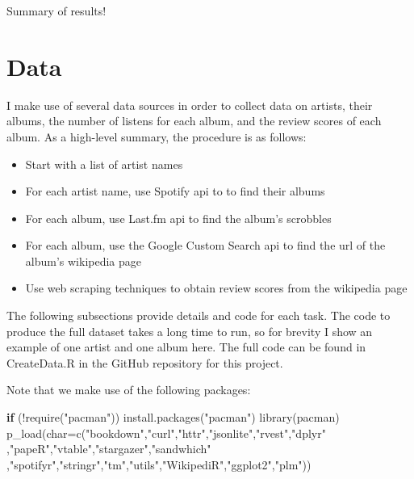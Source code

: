 \documentclass[
  11pt,
]{article}
\newenvironment{Shaded}{\begin{snugshade}}{\end{snugshade}}
\newcommand{\AttributeTok}[1]{\textcolor[rgb]{0.77,0.63,0.00}{#1}}
\newcommand{\ControlFlowTok}[1]{\textcolor[rgb]{0.13,0.29,0.53}{\textbf{#1}}}
\newcommand{\FunctionTok}[1]{\textcolor[rgb]{0.00,0.00,0.00}{#1}}
\newcommand{\NormalTok}[1]{#1}
\newcommand{\SpecialCharTok}[1]{\textcolor[rgb]{0.00,0.00,0.00}{#1}}
\newcommand{\StringTok}[1]{\textcolor[rgb]{0.31,0.60,0.02}{#1}}
\providecommand{\tightlist}{%
  \setlength{\itemsep}{0pt}\setlength{\parskip}{0pt}}
\begin{document}
Summary of results!

\hypertarget{data}{%
\section{Data}\label{data}}

I make use of several data sources in order to collect data on artists,
their albums, the number of listens for each album, and the review
scores of each album. As a high-level summary, the procedure is as
follows:

\begin{itemize}
\tightlist
\item
  Start with a list of artist names
\item
  For each artist name, use Spotify api to to find their albums
\item
  For each album, use Last.fm api to find the album's scrobbles
\item
  For each album, use the Google Custom Search api to find the url of
  the album's wikipedia page
\item
  Use web scraping techniques to obtain review scores from the wikipedia
  page
\end{itemize}

The following subsections provide details and code for each task. The
code to produce the full dataset takes a long time to run, so for
brevity I show an example of one artist and one album here. The full
code can be found in CreateData.R in the GitHub repository for this
project.

Note that we make use of the following packages:

\begin{Shaded}
\begin{Highlighting}[]
\ControlFlowTok{if}\NormalTok{ (}\SpecialCharTok{!}\FunctionTok{require}\NormalTok{(}\StringTok{"pacman"}\NormalTok{)) }\FunctionTok{install.packages}\NormalTok{(}\StringTok{"pacman"}\NormalTok{)}
\FunctionTok{library}\NormalTok{(pacman)}
\FunctionTok{p\_load}\NormalTok{(}\AttributeTok{char=}\FunctionTok{c}\NormalTok{(}\StringTok{"bookdown"}\NormalTok{,}\StringTok{"curl"}\NormalTok{,}\StringTok{"httr"}\NormalTok{,}\StringTok{"jsonlite"}\NormalTok{,}\StringTok{"rvest"}\NormalTok{,}\StringTok{"dplyr"}
\NormalTok{              ,}\StringTok{"papeR"}\NormalTok{,}\StringTok{"vtable"}\NormalTok{,}\StringTok{"stargazer"}\NormalTok{,}\StringTok{"sandwhich"}
\NormalTok{             ,}\StringTok{"spotifyr"}\NormalTok{,}\StringTok{"stringr"}\NormalTok{,}\StringTok{"tm"}\NormalTok{,}\StringTok{"utils"}\NormalTok{,}\StringTok{"WikipediR"}\NormalTok{,}\StringTok{"ggplot2"}\NormalTok{,}\StringTok{"plm"}\NormalTok{))}
\end{Highlighting}
\end{Shaded}
\end{document}
